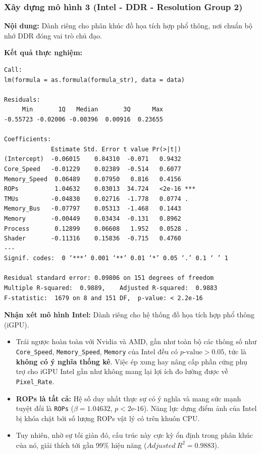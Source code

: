 \subsubsection{Xây dựng mô hình 3 (Intel - DDR - Resolution Group 2)}

\textbf{Nội dung:} Dành riêng cho phân khúc đồ họa tích hợp phổ thông, nơi chuẩn bộ nhớ DDR đóng vai trò chủ đạo.

\textbf{Kết quả thực nghiệm:}
\begin{center}
\begin{minipage}{0.85\textwidth}
\begin{mdframed}
\begin{verbatim}
Call:
lm(formula = as.formula(formula_str), data = data)

Residuals:
     Min       1Q   Median       3Q      Max 
-0.55723 -0.02006 -0.00396  0.00916  0.23655 

Coefficients:
             Estimate Std. Error t value Pr(>|t|)    
(Intercept)  -0.06015    0.84310  -0.071   0.9432    
Core_Speed   -0.01229    0.02389  -0.514   0.6077    
Memory_Speed  0.06489    0.07950   0.816   0.4156    
ROPs          1.04632    0.03013  34.724   <2e-16 ***
TMUs         -0.04830    0.02716  -1.778   0.0774 .  
Memory_Bus   -0.07797    0.05313  -1.468   0.1443    
Memory       -0.00449    0.03434  -0.131   0.8962    
Process       0.12899    0.06608   1.952   0.0528 .  
Shader       -0.11316    0.15836  -0.715   0.4760    
---
Signif. codes:  0 ‘***’ 0.001 ‘**’ 0.01 ‘*’ 0.05 ‘.’ 0.1 ‘ ’ 1

Residual standard error: 0.09806 on 151 degrees of freedom
Multiple R-squared:  0.9889,    Adjusted R-squared:  0.9883 
F-statistic:  1679 on 8 and 151 DF,  p-value: < 2.2e-16
\end{verbatim}
\end{mdframed}
\end{minipage}
\end{center}

\textbf{Nhận xét mô hình Intel:} Dành riêng cho hệ thống đồ họa tích hợp phổ thông (iGPU).
\begin{itemize}
    \item Trái ngược hoàn toàn với Nvidia và AMD, gần như toàn bộ các thông số như \texttt{Core\_Speed}, \texttt{Memory\_Speed}, \texttt{Memory} của Intel đều có $p\text{-value} > 0.05$, tức là \textbf{không có ý nghĩa thống kê}. Việc ép xung hay nâng cấp phần cứng phụ trợ cho iGPU Intel gần như không mang lại lợi ích đo lường được về \texttt{Pixel\_Rate}.
    \item \textbf{ROPs là tất cả:} Hệ số duy nhất thực sự có ý nghĩa và mang sức mạnh tuyệt đối là \texttt{ROPs} ($\beta = 1.04632$, $p < 2\text{e-}16$). Năng lực dựng điểm ảnh của Intel bị khóa chặt bởi số lượng ROPs vật lý có trên khuôn CPU.
    \item Tuy nhiên, nhờ sự tối giản đó, cấu trúc này cực kỳ ổn định trong phân khúc của nó, giải thích tới gần 99\% hiệu năng ($Adjusted\ R^2 = 0.9883$).
\end{itemize}

